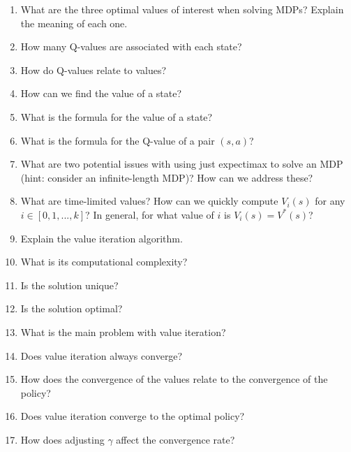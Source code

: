 \documentclass[]{article}
\begin{document}
\begin{enumerate}
\item What are the three optimal values of interest when solving MDPs? Explain the meaning of each one. \\
\item How many Q-values are associated with each state?
\item How do Q-values relate to values?
\item How can we find the value of a state?
\item What is the formula for the value of a state?
\item What is the formula for the Q-value of a pair $(s,a)$?
\item What are two potential issues with using just expectimax to solve an MDP (hint: consider an infinite-length MDP)? How can we address these? \\
\item What are time-limited values? How can we quickly compute $V_{i}(s)$ for any $i \in [0,1,...,k]$? In general, for what value of $i$ is $V_{i}(s) = V^{*}(s)$? \\
\item Explain the value iteration algorithm.
\item What is its computational complexity?
\item Is the solution unique?
\item Is the solution optimal?
\item What is the main problem with value iteration?
\item Does value iteration always converge?
\item How does the convergence of the values relate to the convergence of the policy?
\item Does value iteration converge to the optimal policy?
\item How does adjusting $\gamma$ affect the convergence rate? \\
\end{enumerate}
\end{document}
